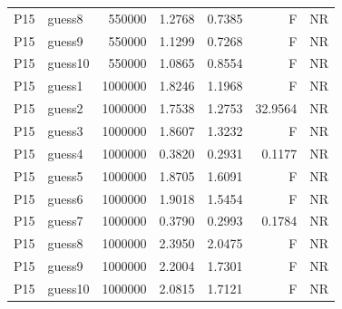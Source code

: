{\begin{longtable}{llrrrrr}
P15 & guess8 & 550000 & 1.2768 & 0.7385 & F & NR \\
P15 & guess9 & 550000 & 1.1299 & 0.7268 & F & NR \\
P15 & guess10 & 550000 & 1.0865 & 0.8554 & F & NR \\
P15 & guess1 & 1000000 & 1.8246 & 1.1968 & F & NR \\
P15 & guess2 & 1000000 & 1.7538 & 1.2753 & 32.9564 & NR \\
P15 & guess3 & 1000000 & 1.8607 & 1.3232 & F & NR \\
P15 & guess4 & 1000000 & 0.3820 & 0.2931 & 0.1177 & NR \\
P15 & guess5 & 1000000 & 1.8705 & 1.6091 & F & NR \\
P15 & guess6 & 1000000 & 1.9018 & 1.5454 & F & NR \\
P15 & guess7 & 1000000 & 0.3790 & 0.2993 & 0.1784 & NR \\
P15 & guess8 & 1000000 & 2.3950 & 2.0475 & F & NR \\
P15 & guess9 & 1000000 & 2.2004 & 1.7301 & F & NR \\
P15 & guess10 & 1000000 & 2.0815 & 1.7121 & F & NR \\
\end{longtable}}

